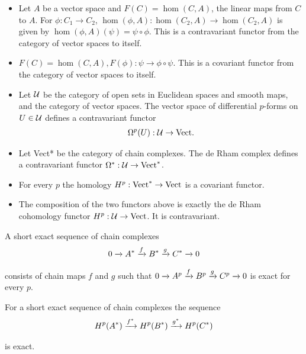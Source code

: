 \begin{itemize}
  \item Let $A$ be a vector space and $F(C) = \hom(C, A)$, the linear maps from
        $C$ to $A$. For $\phi:C_1\to C_2$, $\hom(\phi, A):\hom(C_2, A)\to \hom(C_2,A)$ is
        given by $\hom(\phi, A)(\psi) = \psi\circ\phi$. This is a contravariant functor from the
        category of vector spaces to itself.
  \item $F(C) = \hom(C, A), F(\phi):\psi \to\phi\circ\psi$. This is a covariant functor from the
        category of vector spaces to itself.
  \item Let $\mathcal{U}$ be the category of open sets in Euclidean spaces and smooth maps,
        and  the category of vector spaces. The vector space of differential
        $p$-forms on $U\in\mathcal{U}$ defines a contravariant functor
        \begin{align*}
          \Omega^p(U):\mathcal{U}\to \mathrm{Vect}.
        \end{align*}
  \item Let Vect* be the category of chain complexes. The de Rham complex
        defines a contravariant functor $\Omega^*:\mathcal{U}\to\mathrm{Vect}^*$.
  \item For every $p$ the homology $H^p:\mathrm{Vect}^*\to\mathrm{Vect}$ is a covariant functor.
  \item The composition of the two functors above is exactly the de Rham
        cohomology functor $H^p:\mathcal{U}\to\mathrm{Vect}$. It is contravariant.
\end{itemize}

A short exact sequence of chain complexes
\begin{align*}
  0\xrightarrow[]{} A^*\xrightarrow[]{f} B^*\xrightarrow[]{g} C^*\xrightarrow[]{} 0
\end{align*}

consists of chain maps $f$ and $g$ such that $0\xrightarrow[]{}A^p\xrightarrow[]{f}B^p\xrightarrow[]{g}C^p\xrightarrow[]{}0$ is exact
for every $p$.

\begin{lemma}\label{lemma:4-4}
  For a short exact sequence of chain complexes the sequence
  \begin{align*}
    H^p(A^*)\xrightarrow[]{f^*} H^p(B^*)\xrightarrow[]{g^*} H^p(C^*)
  \end{align*}

  is exact.
\end{lemma}

